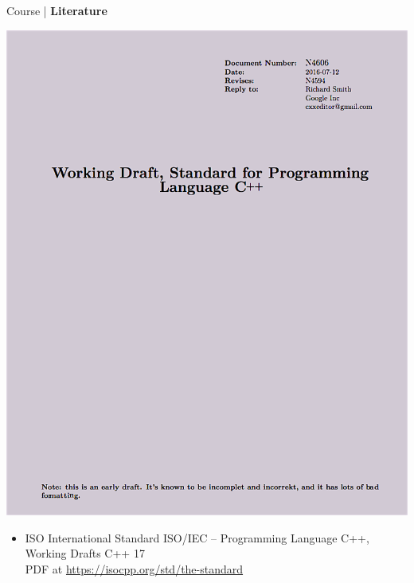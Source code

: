 \begin{frame}{Course | \textbf{Literature}}
    
    {
        \includegraphics[width=\textwidth]{images/iso4606}
    }
    {
        \begin{itemize}
            \item ISO International Standard ISO/IEC 
            – Programming Language C++, Working Drafts C++ 17 \\
            PDF at \url{https://isocpp.org/std/the-standard}
        \end{itemize}
    }

\end{frame}
